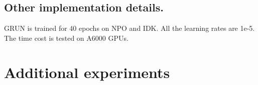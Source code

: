 \subsection{Other implementation details.}
\label{appd:details}

GRUN is trained for 40 epochs on NPO and IDK. All the learning rates are 1e-5. The time cost is tested on A6000 GPUs.

\section{Additional experiments}
\label{appd:g_output}

\begin{table}[t]
    \centering
    \caption{Outputs of gate functions. $l=20, 25, 31$ represents the last 12th, last 7th and last layer respectively. The arrow $\uparrow$ (or $\downarrow$) means the output is expected to be close to 1 (or 0).}
  \label{tab:gate_output}
\end{table}


